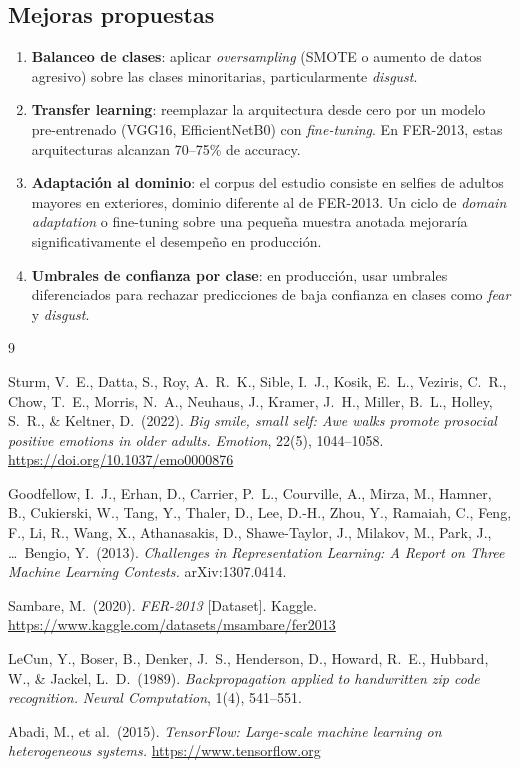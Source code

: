\documentclass[12pt, a4paper]{article}
\begin{document}
\subsection{Mejoras propuestas}

\begin{enumerate}
  \item \textbf{Balanceo de clases}: aplicar \textit{oversampling} (SMOTE o aumento
        de datos agresivo) sobre las clases minoritarias, particularmente
        \textit{disgust}.
  \item \textbf{Transfer learning}: reemplazar la arquitectura desde cero por un
        modelo pre-entrenado (VGG16, EfficientNetB0) con \textit{fine-tuning}. En
        FER-2013, estas arquitecturas alcanzan 70–75\% de accuracy.
  \item \textbf{Adaptación al dominio}: el corpus del estudio consiste en selfies de
        adultos mayores en exteriores, dominio diferente al de FER-2013. Un ciclo de
        \textit{domain adaptation} o fine-tuning sobre una pequeña muestra anotada
        mejoraría significativamente el desempeño en producción.
  \item \textbf{Umbrales de confianza por clase}: en producción, usar umbrales
        diferenciados para rechazar predicciones de baja confianza en clases como
        \textit{fear} y \textit{disgust}.
\end{enumerate}

\begin{thebibliography}{9}

Sturm, V.\ E., Datta, S., Roy, A.\ R.\ K., Sible, I.\ J., Kosik, E.\ L., Veziris, C.\ R.,
Chow, T.\ E., Morris, N.\ A., Neuhaus, J., Kramer, J.\ H., Miller, B.\ L., Holley, S.\ R.,
\& Keltner, D.\ (2022).
\textit{Big smile, small self: Awe walks promote prosocial positive emotions in older adults.}
\textit{Emotion}, 22(5), 1044–1058.
\url{https://doi.org/10.1037/emo0000876}

Goodfellow, I.\ J., Erhan, D., Carrier, P.\ L., Courville, A., Mirza, M., Hamner, B.,
Cukierski, W., Tang, Y., Thaler, D., Lee, D.-H., Zhou, Y., Ramaiah, C., Feng, F., Li, R.,
Wang, X., Athanasakis, D., Shawe-Taylor, J., Milakov, M., Park, J., \ldots\ Bengio, Y.\
(2013).
\textit{Challenges in Representation Learning: A Report on Three Machine Learning Contests.}
arXiv:1307.0414.

Sambare, M.\ (2020).
\textit{FER-2013} [Dataset].
Kaggle.
\url{https://www.kaggle.com/datasets/msambare/fer2013}

LeCun, Y., Boser, B., Denker, J.\ S., Henderson, D., Howard, R.\ E., Hubbard, W.,
\& Jackel, L.\ D.\ (1989).
\textit{Backpropagation applied to handwritten zip code recognition.}
\textit{Neural Computation}, 1(4), 541–551.

Abadi, M., et al.\ (2015).
\textit{TensorFlow: Large-scale machine learning on heterogeneous systems.}
\url{https://www.tensorflow.org}

\end{thebibliography}
\end{document}
